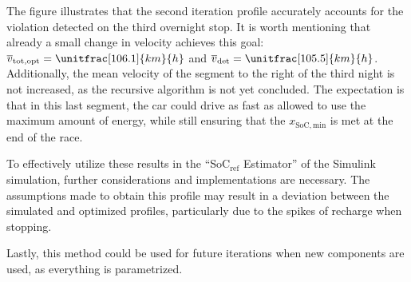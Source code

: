 The figure illustrates that the second iteration profile accurately accounts for the violation detected on the third overnight stop. It is worth mentioning that already a small change in velocity achieves this goal: $\overline{v}_\mathrm{tot,opt} = \unitfrac[106.1]{km}{h}$ and $\overline{v}_\mathrm{det} = \unitfrac[105.5]{km}{h}$. Additionally, the mean velocity of the segment to the right of the third night is not increased, as the recursive algorithm is not yet concluded. The expectation is that in this last segment, the car could drive as fast as allowed to use the maximum amount of energy, while still ensuring that the $x_\mathrm{SoC,min}$ is met at the end of the race.

To effectively utilize these results in the \enquote{SoC$_\mathrm{ref}$ Estimator} of the Simulink simulation, further considerations and implementations are necessary. The assumptions made to obtain this profile may result in a deviation between the simulated and optimized profiles, particularly due to the spikes of recharge when stopping.

Lastly, this method could be used for future iterations when new components are used, as everything is parametrized.



